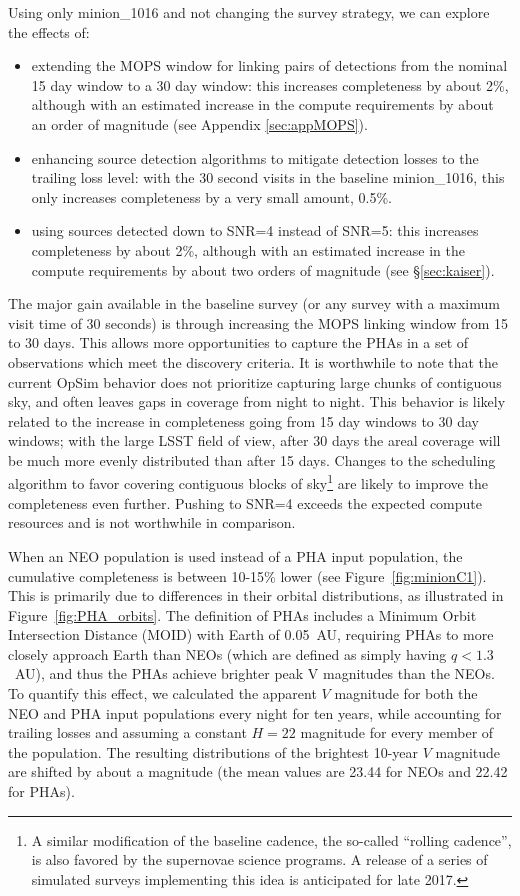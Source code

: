Using only minion\_1016 and not changing the survey strategy, we can explore the effects of:
\begin{itemize}
\item extending the MOPS window for linking pairs of detections from the nominal 15 day window to a 30 day window: this increases completeness by about 2\%, although with an estimated increase in the compute requirements by about an order of magnitude (see Appendix \ref{sec:appMOPS}).
\item enhancing source detection algorithms to mitigate detection losses to the trailing loss level: with the 30 second visits in the baseline minion\_1016, this only increases completeness by a very small amount, 0.5\%.
\item using sources detected down to SNR=4 instead of SNR=5: this increases completeness by about 2\%, although with an estimated increase in the compute requirements by about two orders of magnitude (see \S\ref{sec:kaiser}). 
\end{itemize}

The major gain available in the baseline survey (or any survey with a maximum visit time of 30 seconds) is through increasing the MOPS linking window from 15 to 30 days. This allows more opportunities to capture the PHAs in a set of observations which meet the discovery criteria. It is worthwhile to note that the current OpSim behavior does not prioritize capturing large chunks of contiguous sky, and often leaves gaps in coverage from night to night. This behavior is likely related to the increase in completeness going from 15 day windows to 30 day windows; with the large LSST field of view, after 30 days the areal coverage will be much more evenly distributed than after 15 days. Changes to the scheduling algorithm to favor covering contiguous blocks of sky\footnote{A similar modification of
the baseline cadence, the so-called ``rolling cadence'', is also favored by the supernovae science programs. A release of a series of simulated surveys implementing this idea is anticipated for late 2017.} are likely to improve the completeness even further.  Pushing to SNR=4 exceeds the expected compute resources and is not worthwhile in comparison.


When an NEO population is used instead of a PHA input population, the cumulative completeness is between 10-15\% lower 
(see Figure~\ref{fig:minionC1}). This is primarily due to differences in their orbital distributions, as illustrated in Figure~\ref{fig:PHA_orbits}. The definition of PHAs includes a Minimum Orbit Intersection Distance (MOID) with Earth of 0.05~AU, requiring PHAs to more closely approach Earth than NEOs (which are defined as simply having $q<1.3$~AU), and thus the PHAs achieve brighter peak V magnitudes than the NEOs. To quantify this effect, we calculated the apparent $V$ magnitude for both the NEO and PHA input populations every night for ten years, while accounting for trailing losses and assuming a constant $H=22$ magnitude for every member of the population. The resulting distributions of the 
brightest 10-year $V$ magnitude are shifted by about a magnitude (the mean values are 23.44 for NEOs and 22.42 for PHAs). 


